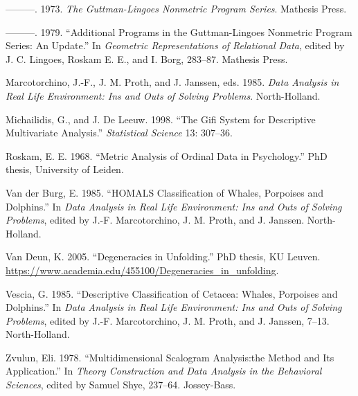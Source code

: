 \documentclass[
  12pt,
  letterpaper,
  DIV=11,
  numbers=noendperiod]{scrartcl}
\newlength{\cslhangindent}
\newenvironment{CSLReferences}[2] %
 {\begin{list}{}{%
  \setlength{\itemindent}{0pt}
  \setlength{\leftmargin}{0pt}
  \setlength{\parsep}{0pt}
  \ifodd #1
   \setlength{\leftmargin}{\cslhangindent}
   \setlength{\itemindent}{-1\cslhangindent}
  \fi
  \setlength{\itemsep}{#2\baselineskip}}}
 {\end{list}}
\begin{document}
\begin{CSLReferences}{1}{0}
---------. 1973. \emph{{The Guttman-Lingoes Nonmetric Program Series}}.
Mathesis Press.

---------. 1979. {``Additional Programs in the Guttman-Lingoes Nonmetric
Program Series: An Update.''} In \emph{{Geometric Representations of
Relational Data}}, edited by J. C. Lingoes, Roskam E. E., and I. Borg,
283--87. Mathesis Press.

Marcotorchino, J.-F., J. M. Proth, and J. Janssen, eds. 1985. \emph{Data
Analysis in Real Life Environment: Ins and Outs of Solving Problems}.
North-Holland.

Michailidis, G., and J. De Leeuw. 1998. {``The Gifi System for
Descriptive Multivariate Analysis.''} \emph{Statistical Science} 13:
307--36.

Roskam, E. E. 1968. {``{Metric Analysis of Ordinal Data in
Psychology}.''} PhD thesis, University of Leiden.

Van der Burg, E. 1985. {``HOMALS Classification of Whales, Porpoises and
Dolphins.''} In \emph{Data Analysis in Real Life Environment: Ins and
Outs of Solving Problems}, edited by J.-F. Marcotorchino, J. M. Proth,
and J. Janssen. North-Holland.

Van Deun, K. 2005. {``Degeneracies in Unfolding.''} PhD thesis, KU
Leuven. \url{https://www.academia.edu/455100/Degeneracies_in_unfolding}.

Vescia, G. 1985. {``Descriptive Classification of Cetacea: Whales,
Porpoises and Dolphins.''} In \emph{Data Analysis in Real Life
Environment: Ins and Outs of Solving Problems}, edited by J.-F.
Marcotorchino, J. M. Proth, and J. Janssen, 7--13. North-Holland.

Zvulun, Eli. 1978. {``Multidimensional Scalogram Analysis:the Method and
Its Application.''} In \emph{Theory Construction and Data Analysis in
the Behavioral Sciences}, edited by Samuel Shye, 237--64. Jossey-Bass.

\end{CSLReferences}
\end{document}
